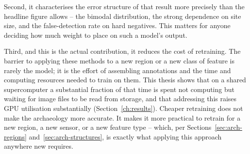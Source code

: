 Second, it characterises the error structure of that result more precisely than
the headline figure allows -- the bimodal distribution, the strong dependence
on site size, and the false-detection rate on hard negatives. This matters for
anyone deciding how much weight to place on such a model's output.

Third, and this is the actual contribution, it reduces the cost of retraining.
The barrier to applying these methods to a new region or a new class of feature
is rarely the model; it is the effort of assembling annotations and the time
and computing resources needed to train on them. This thesis shows that on a
shared supercomputer a substantial fraction of that time is spent not
computing but waiting for image files to be read from storage, and that
addressing this raises GPU utilisation substantially
(Section~\ref{ch:results}). Cheaper retraining does not make the archaeology
more accurate. It makes it more practical to retrain for a new region, a new
sensor, or a new feature type -- which, per
Sections~\ref{sec:arch-regions} and~\ref{sec:arch-structures}, is exactly what
applying this approach anywhere new requires.
